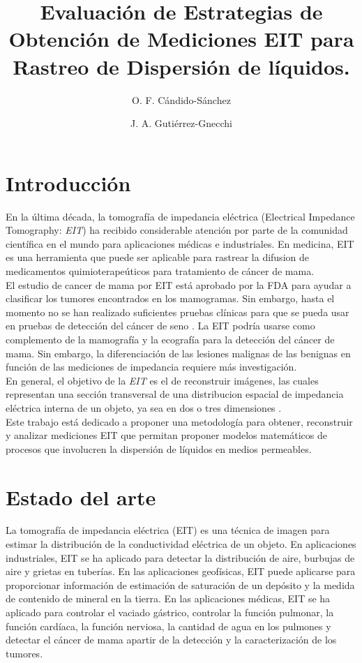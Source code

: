 \documentclass{IEEEtran}
\title{Evaluación de Estrategias de Obtención de Mediciones EIT para Rastreo de Dispersión de líquidos. }
\author[1]{O. F. Cándido-Sánchez}
\author[1]{J. A. Gutiérrez-Gnecchi}
\affil[1]{Departamento de Ingeniería Electrónica, Instituto Tecnológico de Morelia}
\begin{document}
  \maketitle
  \begin{abstract}
  \end{abstract}

  \begin{IEEEkeywords}
  \end{IEEEkeywords}

  \section{Introducción}
En la última década, la tomografía de impedancia eléctrica (Electrical Impedance Tomography: \textit{EIT}) ha recibido considerable atención por parte de la comunidad científica en el mundo para aplicaciones médicas e industriales. En medicina, EIT es una herramienta que puede ser aplicable para rastrear la difusion de medicamentos quimioterapeúticos para tratamiento de cáncer de mama\cite{Gnecchi2018}.\\
El estudio de cancer de mama por EIT está aprobado por la FDA para ayudar a clasificar los tumores encontrados en los mamogramas. Sin embargo, hasta el momento no se han realizado suficientes pruebas clínicas para que se pueda usar en pruebas de detección del cáncer de seno \cite{Cancer.org}. La EIT podría usarse como complemento de la mamografía y la ecografía para la detección del cáncer de mama. Sin embargo, la diferenciación de las lesiones malignas de las benignas en función de las mediciones de impedancia requiere más investigación\cite{Zou2003}.\\
En general, el objetivo de la \textit{EIT} es el de reconstruir imágenes, las cuales representan una sección transversal de una distribucion espacial de impedancia eléctrica interna de un objeto, ya sea en dos o tres dimensiones \cite{Mendoza2012}.\\
Este trabajo está dedicado a proponer una metodología para obtener, reconstruir y analizar mediciones EIT que permitan proponer modelos matemáticos de procesos que involucren la dispersión de líquidos en medios permeables.\\
\section{Estado del arte}
La tomografía de impedancia eléctrica (EIT) es una técnica de imagen para estimar la distribución de la conductividad eléctrica de un objeto. En aplicaciones industriales, EIT se ha aplicado para detectar la distribución de aire, burbujas de aire y grietas en tuberías. En las aplicaciones geofísicas, EIT puede aplicarse para proporcionar información de estimación de saturación de un depósito y la medida de contenido de mineral en la tierra.
En las aplicaciones médicas, EIT se ha aplicado para controlar el vaciado gástrico, controlar la función pulmonar, la función cardíaca, la función nerviosa, la cantidad de agua en los pulmones y detectar el cáncer de mama apartir de la detección y la caracterización de los tumores\cite{Wang2011}.
\end{document}
